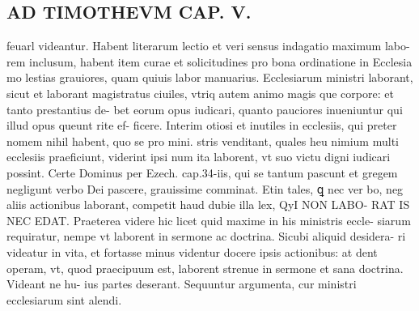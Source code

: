 \documentclass{article}
\begin{document}
\begin{pages}
\section*{AD TIMOTHEVM CAP. V. }
\marginpar{[ p.113 ]}\pstart feuarl videantur. Habent literarum lectio et veri sensus indagatio maximum labo- rem inclusum, habent item curae et solicitudines pro bona ordinatione in Ecclesia mo lestias grauiores, quam quiuis labor manuarius. Ecclesiarum ministri laborant, sicut et laborant magistratus ciuiles, vtriq autem animo magis que corpore: et tanto prestantius de- bet eorum opus iudicari, quanto pauciores inueniuntur qui illud opus queunt rite ef- ficere. Interim otiosi et inutiles in ecclesiis, qui preter nomem nihil habent, quo se pro mini. stris venditant, quales heu nimium multi ecclesiis praeficiunt, viderint ipsi num ita laborent, vt suo victu digni iudicari possint. Certe Dominus per Ezech. cap.34-iis, qui se tantum pascunt et gregem negligunt verbo Dei pascere, grauissime comminat. Etin tales, ꝗ nec ver bo, neg aliis actionibus laborant, competit haud dubie illa lex, QyI NON LABO- RAT IS NEC EDAT. Praeterea videre hic licet quid maxime in his ministris eccle- siarum requiratur, nempe vt laborent in sermone ac doctrina. Sicubi aliquid desidera- ri videatur in vita, et fortasse minus videntur docere ipsis actionibus: at dent operam, vt, quod praecipuum est, laborent strenue in sermone et sana doctrina. Videant ne hu- ius partes deserant. Sequuntur argumenta, cur ministri ecclesiarum sint alendi.  \pend
{}
{}

\end{pages}
\end{document}
